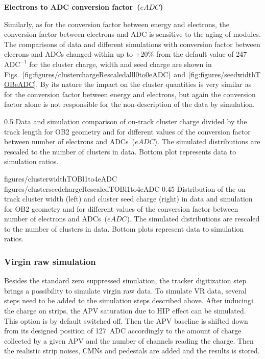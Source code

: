 \textbf{Electrons to ADC conversion factor~($eADC$)}

Similarly, as for the conversion factor between energy and electrons, the conversion factor between electrons and ADC is sensitive to the aging of modules. The comparisons of data and different simulations with conversion factor between elecrons and ADCs changed within up to $\pm 20\%$ from the default value of 247~$\mathrm{ADC^{-1}}$ for the cluster charge, width and seed charge are shown in Figs.~\ref{fig:figures/clusterchargeRescaledalll0to0eADC}~and~\ref{fig:figures/seedwidthTOBeADC}. By its nature the impact on the cluster quantities is very similar as for the conversion factor between energy and electrons, but again the conversion factor alone is not responsible for the non-description of the data by simulation.  


                 {0.5}       %
                 { Data and simulation comparison of on-track cluster charge divided by the track length for OB2 geometry and for different values of the conversion factor between number of electrons and ADCs~($eADC$). The simulated distributions are rescaled to the number of clusters in data.  Bottom plot represents data to simulation ratios. }

                 {figures/clusterwidthTOBl1to4eADC}
                 {figures/clusterseedchargeRescaledTOBl1to4eADC} %
                 {0.45}       %
                 { Distribution of the on-track cluster width (left) and cluster seed charge (right) in data and simulation for OB2 geometry and for different values of the conversion factor between number of electrons and ADCs~($eADC$).  The simulated distributions are rescaled to the number of clusters in data.  Bottom plots represent data to simulation ratios. }

 
\subsubsection{Virgin raw simulation~\label{sec:VRsimu}}

Besides the standard zero suppressed simulation, the tracker digitization step brings a possibility to simulate virgin raw data. To simulate VR data, several steps need to be added to the simulation steps described above. After inducingi the charge on strips, the APV saturation due to HIP effect can be simulated. This option is by default switched off. Then the APV baseline is shifted down from its designed position of 127~ADC accordingly to the amount of charge collected by a given APV and the number of channels reading the charge. Then the realistic strip noises, CMNs and pedestals are added and the results is stored.

